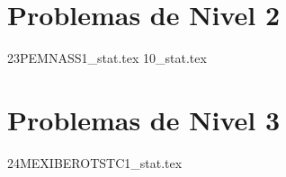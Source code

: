 \section{Problemas de Nivel 2}
{23PEMNASS1_stat.tex} %
{10_stat.tex} %

\section{Problemas de Nivel 3}
{24MEXIBEROTSTC1_stat.tex} %